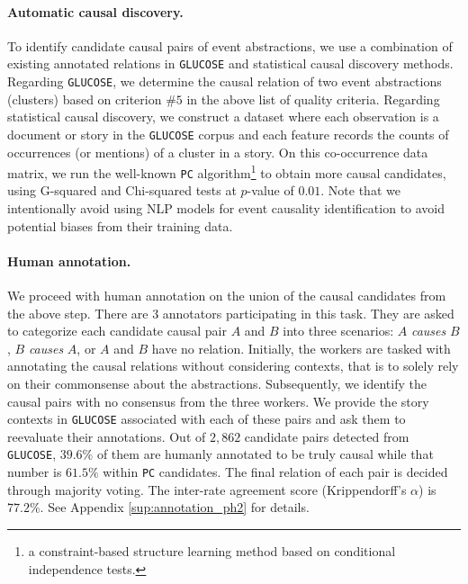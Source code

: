 \paragraph{Automatic causal discovery.}
To identify candidate causal pairs of event abstractions, we use a combination of existing annotated relations in \texttt{GLUCOSE} and statistical causal discovery methods. Regarding \texttt{GLUCOSE}, we determine the causal relation of two event abstractions (clusters) based on criterion $\#5$ in the above list of quality criteria. Regarding statistical causal discovery, we construct a dataset where each observation is a document or story in the \texttt{GLUCOSE} corpus and each feature records the counts of occurrences (or mentions) of a cluster in a story. On this co-occurrence data matrix, we run the well-known \texttt{PC} algorithm\footnote{a constraint-based structure learning method based on conditional independence tests.} \citep{spirtes2000causation} to obtain more causal candidates, using G-squared and Chi-squared tests at $p$-value of $0.01$. Note that we intentionally avoid using NLP models for event causality identification to avoid potential biases from their training data.  

\paragraph{Human annotation.} We proceed with human annotation on the union of the causal candidates from the above step. There are $3$ annotators participating in this task. They are asked to categorize each candidate causal pair $A$ and $B$ into three scenarios: $A$ \textit{causes} $B$, $B$ \textit{causes} $A$, or $A$ and $B$ have no relation. Initially, the workers are tasked with annotating the causal relations without considering contexts, that is to solely rely on their commonsense about the abstractions. Subsequently, we identify the causal pairs with no consensus from the three workers. We provide the story contexts in \texttt{GLUCOSE} associated with each of these pairs and ask them to reevaluate their annotations. Out of $2,862$ candidate pairs detected from \texttt{GLUCOSE}, $39.6\%$ of them are humanly annotated to be truly causal while that number is $61.5\%$ within \texttt{PC} candidates. The final relation of each pair is decided through majority voting. The inter-rate agreement score (Krippendorff’s $\alpha$) is $77.2\%$. See Appendix \ref{sup:annotation_ph2} for details.

